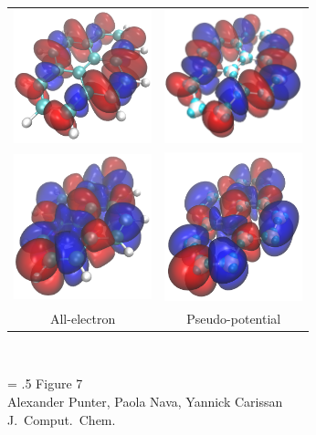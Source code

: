 \documentclass[12pt]{article}
\begin{document}
\begin{figure}
\begin{tabular}{|c|c|}
\hline
\includegraphics[width=4cm]{pyrene_peak1_ref_white} &
\includegraphics[width=4cm]{pyrene_peak1_ps_white} \\
\includegraphics[width=4cm]{pyrene_peak2_ref_white} &
\includegraphics[width=4cm]{pyrene_peak2_ps_white} \\
\hline
All-electron & Pseudo-potential\\
\hline
\end{tabular}\\
\vspace{0.25in}
\hspace*{3in}
{\Large
\begin{minipage}[t]{3in}
\baselineskip = .5\baselineskip
Figure 7 \\
Alexander Punter, Paola Nava, Yannick Carissan\\
J.\ Comput.\ Chem.
\end{minipage}
}
\end{figure}
\end{document}
